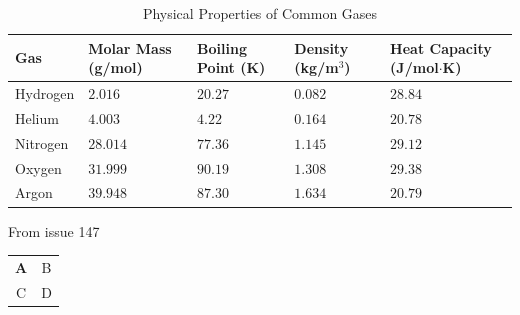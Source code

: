 \begin{table}[h!]
\centering
\caption{Physical Properties of Common Gases}
\label{tab:gases}
\begin{tabularx}{\textwidth}{|l|X|X|X|X|}
\hline
\textbf{Gas} & \textbf{Molar Mass (g/mol)} & \textbf{Boiling Point (K)} & \textbf{Density (kg/m$^3$)} & \textbf{Heat Capacity (J/mol$\cdot$K)} \\
\hline
Hydrogen   & $2.016$  & $20.27$  & $0.082$ & $28.84$ \\
Helium     & $4.003$  & $4.22$   & $0.164$ & $20.78$ \\
Nitrogen   & $28.014$ & $77.36$  & $1.145$ & $29.12$ \\
Oxygen     & $31.999$ & $90.19$  & $1.308$ & $29.38$ \\
Argon      & $39.948$ & $87.30$  & $1.634$ & $20.79$ \\
\hline
\end{tabularx}
\end{table}

From issue 147

\begin{tabular}{cc}
  \textbf{A} & B \\ C & D
\end{tabular}


